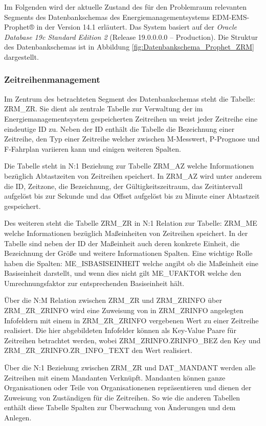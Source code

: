 Im Folgenden wird der aktuelle Zustand des für den Problemraum relevanten Segments des Datenbankschemas des Energiemanagementsystems EDM-EMS-Prophet® in der Version 14.1 erläutert.  
Das System basiert auf der \textit{Oracle Database 19c Standard Edition 2} (Release 19.0.0.0.0 – Production). 
Die Struktur des Datenbankschemas ist in Abbildung \eqref{fig:Datenbankschema_Prophet_ZRM} dargestellt.

\subsubsection{Zeitreihenmanagement}
Im Zentrum des betrachteten Segment des Datenbankschemas steht die Tabelle: ZRM\_ZR. 
Sie dient als zentrale Tabelle zur Verwaltung der im Energiemanagementsystem gespeicherten Zeitreihen un weist jeder Zeitreihe eine eindeutige ID zu.
Neben der ID enthält die Tabelle die Bezeichnung einer Zeitreihe, den Typ einer Zeitreihe  welcher zwischen M-Messwert, P-Prognose 
und F-Fahrplan variieren kann und einigen weiteren Spalten.

Die Tabelle steht in N:1 Beziehung zur Tabelle ZRM\_AZ welche Informationen bezüglich Abtastzeiten von Zeitreihen speichert. 
In ZRM\_AZ wird unter anderem die ID, Zeitzone, die Bezeichnung, der Gültigkeitszeitraum, das Zeitintervall aufgelöst bis zur Sekunde und das 
Offset aufgelöst bis zu Minute einer Abtastzeit gespeichert.

Des weiteren steht die Tabelle ZRM\_ZR in N:1 Relation zur Tabelle: ZRM\_ME welche Informationen bezüglich Maßeinheiten von Zeitreihen speichert.
In der Tabelle sind neben der ID der Maßeinheit auch deren konkrete Einheit, die Bezeichnung der Größe und weitere Informationen Spalten. 
Eine wichtige Rolle haben die Spalten: ME\_ISBASISEINHEIT welche angibt ob die Maßeinheit eine Basiseinheit darstellt, und wenn dies nicht gilt 
ME\_UFAKTOR welche den Umrechnungsfaktor zur entsprechenden Basiseinheit hält.

Über die N:M Relation zwischen ZRM\_ZR und ZRM\_ZRINFO über ZRM\_ZR\_ZRINFO wird eine Zuweisung von in ZRM\_ZRINFO angelegten Infofeldern 
mit einem in ZRM\_ZR\_ZRINFO vergebenen Wert zu einer Zeitreihe realisiert. 
Die hier abgebildeten Infofelder können als Key-Value Paare für Zeitreihen betrachtet werden, wobei ZRM\_ZRINFO.ZRINFO\_BEZ den Key und 
ZRM\_ZR\_ZRINFO.ZR\_INFO\_TEXT den Wert realisiert.

Über die N:1 Beziehung zwischen ZRM\_ZR und DAT\_MANDANT werden alle Zeitreihen mit einem Mandanten Verknüpft. 
Mandanten können ganze Organisationen oder Teile von Organisationenen repräsentieren und dienen der Zuweisung von Zuständigen für die Zeitreihen. 
So wie die anderen Tabellen enthält diese Tabelle Spalten zur Überwachung von Änderungen und dem Anlegen.

